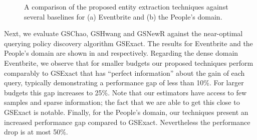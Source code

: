 \begin{figure}[h]
\begin{center}
\end{center}
\caption{A comparison of the proposed entity extraction techniques against several baselines for (a) Eventbrite and (b) the People's domain.}
\label{fig:resultsextr}
\end{figure}

\vspace{3pt}
Next, we evaluate GSChao, GSHwang and GSNewR against the near-optimal querying policy discovery algorithm GSExact. The results for Eventbrite and the People's domain are shown in  and  respectively. Regarding the dense domain Eventbrite, we observe that for smaller budgets our proposed techniques perform comparably to GSExact that has ``perfect information'' about the gain of each query, typically demonstrating a performance gap of less than 10\%. For larger budgets this gap increases to 25\%. Note that our estimators have access to few samples and sparse information; the fact that we are able to get this close to GSExact is notable. Finally, for the People's domain, our techniques present an increased performance gap compared to GSExact. Nevertheless the performance drop is at most 50\%. 


